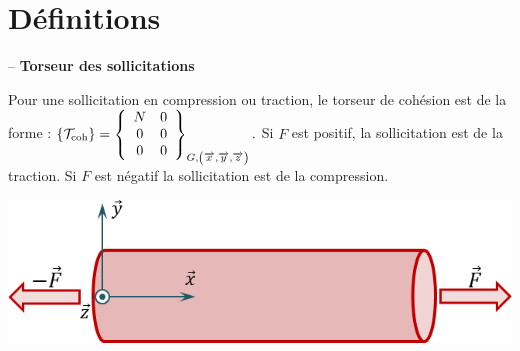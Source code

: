\documentclass[10pt,fleqn]{article} %
\begin{document}

\vspace{2cm}
\pagestyle{fancy}
\thispagestyle{plain}

\section{Définitions}
\begin{defi} -- \textbf{Torseur des sollicitations}  ~\\

\begin{minipage}[c]{.65\linewidth}
Pour une sollicitation en compression ou traction, le torseur de cohésion est de la forme : 
$
\{\mathcal{T}_{\text{coh}}\} = \left\{ \begin{array}{cc} {N} & {0}\\{0} & {0}\\{0} & {0}\\\end{array} \right\}_{G,\left(\overrightarrow{x_{}}, \overrightarrow{y_{}}, \overrightarrow{z_{}} \right)}.
$
Si $F$ est positif, la sollicitation est de la traction. Si $F$ est négatif la sollicitation est de la compression.
\end{minipage} \hfill
\begin{minipage}[c]{.3\linewidth}
\begin{center}
\includegraphics[width=\linewidth]{images/traction}
\end{center}
\end{minipage}



\end{defi}
\end{document}
